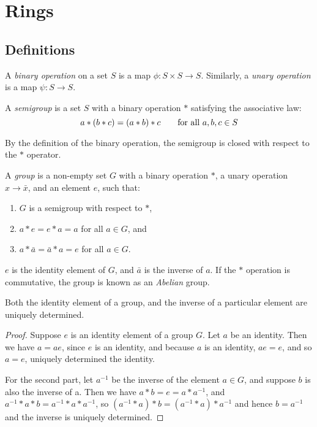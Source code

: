 \section{Rings}

\subsection{Definitions}

  \begin{Def}
    A \emph{binary operation} on a set $S$ is a map $\phi:S \times S \to S$.
    Similarly, a \emph{unary operation} is a map $\psi:S \to S$.
  \end{Def}

  \begin{Def}
    A \emph{semigroup} is a set $S$ with a binary operation $*$ satisfying
    the associative law:
    \[
      a * (b * c) = (a * b) * c \text{\qquad for all } a, b,c \in S
    \]

    By the definition of the binary operation, the semigroup is closed with
    respect to the $*$ operator.

  \end{Def}

  \begin{Def} A \emph{group} is a non-empty set $G$ with a binary
    operation $*$, a unary operation $x \to \bar{x}$,
    and an element $e$, such that:
    \begin{enumerate}[label=(\roman*)]
      \item $G$ is a semigroup with respect to $*$,
      \item $a * e = e * a = a$ for all $a \in G$, and
      \item $a * \bar{a} = \bar{a} * a = e$ for all $a \in G$.
    \end{enumerate}
    $e$ is the identity element of $G$, and $\bar{a}$ is the inverse of $a$.
    If the $*$ operation is commutative, the group is known as an
    \emph{Abelian} group.

  \end{Def}

  \begin{Lemma}
    Both the identity element of a group, and the inverse of a particular
    element are uniquely determined.
  \end{Lemma}

  \begin{proof}
    Suppose $e$ is an identity element of a group $G$. Let $a$ be an identity.
    Then we have $a = ae$, since $e$ is an identity, and because $a$ is an
    identity, $ae = e$, and so $a = e$, uniquely determined the identity.

    For the second part, let $a^{-1}$ be the inverse of the element $a \in G$,
    and suppose $b$ is also the inverse of a. Then we have $a * b = e = a *
    a^{-1}$, and $ a^{-1} * a * b = a^{-1} * a * a^{-1} $, so $ (a^{-1} * a) *
    b = (a^{-1} * a) * a^{-1} $ and hence $b = a^{-1}$ and the inverse is
    uniquely determined.
  \end{proof}

